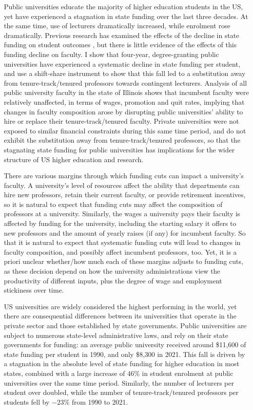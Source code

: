 Public universities educate the majority of higher education students in the US, yet have experienced a stagnation in state funding over the last three decades.
At the same time, use of lecturers dramatically increased, while enrolment rose dramatically.
Previous research has examined the effects of the decline in state funding on student outcomes \citep{NBERw23736,NBERw27885}, but there is little evidence of the effects of this funding decline on faculty.
I show that four-year, degree-granting public universities have experienced a systematic decline in state funding per student, and use a shift-share instrument to show that this fall led to a substitution away from tenure-track/tenured professors towards contingent lecturers.
Analysis of all public university faculty in the state of Illinois shows that incumbent faculty were relatively unaffected, in terms of wages, promotion and quit rates, implying that changes in faculty composition arose by disrupting public universities' ability to hire or replace their tenure-track/tenured faculty. 
Private universities were not exposed to similar financial constraints during this same time period, and do not exhibit the substitution away from tenure-track/tenured professors, so that the stagnating state funding for public universities has implications for the wider structure of US higher education and research.

There are various margins through which funding cuts can impact a university's faculty.
A university's level of resources affect the ability that departments can hire new professors, retain their current faculty, or provide retirement incentives, so it is natural to expect that funding cuts may affect the composition of professors at a university.
Similarly, the wages a university pays their faculty is affected by funding for the university, including the starting salary it offers to new professors and the amount of yearly raises (if any) for incumbent faculty.
So that it is natural to expect that systematic funding cuts will lead to changes in faculty composition, and possibly affect incumbent professors, too.
Yet, it is a priori unclear whether/how much each of these margins adjusts to funding cuts, as these decision depend on how the university administrations view the productivity of different inputs, plus the degree of wage and employment stickiness over time.

US universities are widely considered the highest performing in the world, yet there are consequential differences between its universities that operate in the private sector and those established by state governments.
Public universities are subject to numerous state-level administrative laws, and rely on their state governments for funding: an average public university received around \$11,600 of state funding per student in 1990, and only \$8,300 in 2021.
This fall is driven by a stagnation in the absolute level of state funding for higher education in most states, combined with a large increase of 46\% in student enrolment at public universities over the same time period.
Similarly, the number of lecturers per student over doubled, while the number of tenure-track/tenured professors per students fell by $-23$\% from 1990 to 2021.

